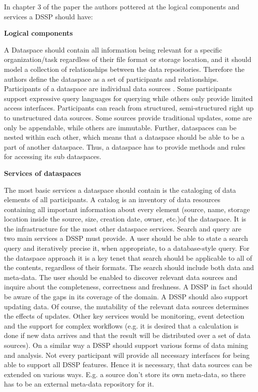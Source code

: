 In chapter 3 of the paper the authors pottered at the logical components and services a DSSP should have:

\textbf{Logical components}

A Dataspace should contain all information being relevant for a specific organization/task regardless of their file format or storage location, and it should model a collection of relationships between the data repositories. Therefore the authors define the dataspace as a set of participants and relationships. Participants of a dataspace are individual data sources . Some participants support expressive query languages for querying while others only provide limited access interfaces. Participants can reach from structured, semi-structured right up to unstructured data sources. Some sources provide traditional updates, some are only be appendable, while others are immutable. Further, dataspaces can be nested within each other, which means that a dataspace should be able to be a part of another dataspace.  Thus, a dataspace has to provide methods and rules for accessing its sub dataspaces.

\textbf{Services of dataspaces}

The most basic services a dataspace should contain is the cataloging of data elements of all participants. A catalog is an inventory of data resources containing all important information about every element (source, name, storage location inside the source, size, creation date, owner, etc.)of the dataspace. It is the infrastructure for the most other dataspace services. Search and query are two main services a DSSP must provide. A user should be able to state a search query and iteratively precise it, when appropriate, to a database-style query. For the dataspace approach it is a key tenet that search should be applicable to all of the contents, regardless of their formats.
The search should include both data and meta-data. The user should be enabled to discover relevant data sources and inquire about the completeness, correctness and freshness. A DSSP in fact should be aware of the gaps in its coverage of the domain.  
A DSSP should also support updating data. Of course, the mutability of the relevant data sources determines the effects of updates.  
Other key services would be monitoring, event detection and the support for complex workflows (e.g. it is desired that a calculation is done if new data arrives and that the result will be distributed over a set of data sources). On a similar way a DSSP should support various forms of data mining and analysis. 
Not every participant will provide all necessary interfaces for being able to support all DSSP features. Hence it is necessary, that data sources can be extended on various ways. E.g. a source don't store its own meta-data, so there has to be an external meta-data repository for it. 

